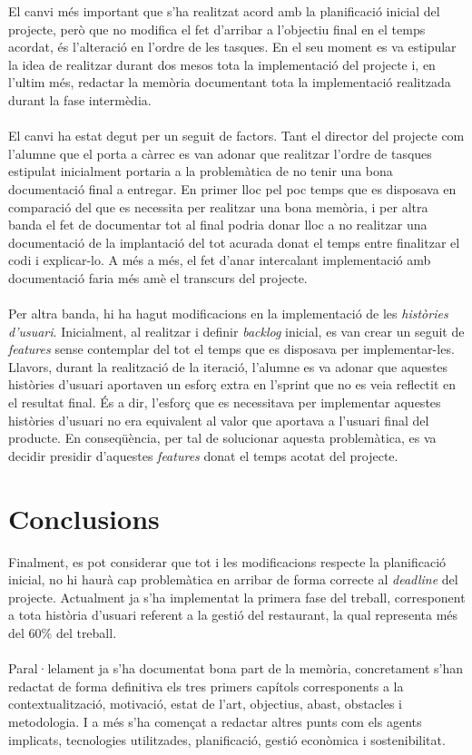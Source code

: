 El canvi més important que s'ha realitzat acord amb la planificació inicial del projecte, però que no modifica el fet d'arribar a l'objectiu final en el temps acordat, és l'alteració en l'ordre de les tasques. En el seu moment es va estipular la idea de realitzar durant dos mesos tota la implementació del projecte i, en l'ultim més, redactar la memòria documentant tota la implementació realitzada durant la fase intermèdia.
\\\\
El canvi ha estat degut per un seguit de factors. Tant el director del projecte com l'alumne que el porta a càrrec es van adonar que realitzar l'ordre de tasques estipulat inicialment portaria a la problemàtica de no tenir una bona documentació final a entregar. En primer lloc pel poc temps que es disposava en comparació del que es necessita per realitzar una bona memòria, i per altra banda el fet de documentar tot al final podria donar lloc a no realitzar una documentació de la implantació del tot acurada donat el temps entre finalitzar el codi i explicar-lo. A més a més, el fet d'anar intercalant implementació amb documentació faria més amè el transcurs del projecte.
\\\\
Per altra banda, hi ha hagut modificacions en la implementació de les \textit{històries d'usuari}. Inicialment, al realitzar i definir \textit{backlog} inicial, es van crear un seguit de \textit{features} sense contemplar del tot el temps que es disposava per implementar-les. Llavors, durant la realització de la iteració, l'alumne es va adonar que aquestes històries d'usuari aportaven un esforç extra en l'sprint que no es veia reflectit en el resultat final. És a dir, l'esforç que es necessitava per implementar aquestes històries d'usuari no era equivalent al valor que aportava a l'usuari final del producte. En conseqüència, per tal de solucionar aquesta problemàtica, es va decidir presidir d'aquestes \textit{features} donat el temps acotat del projecte.


\section{Conclusions}

Finalment, es pot considerar que tot i les modificacions respecte la planificació inicial, no hi haurà cap problemàtica en arribar de forma correcte al \textit{deadline} del projecte. Actualment ja s'ha implementat la primera fase del treball, corresponent a tota història d'usuari referent a la gestió del restaurant, la qual representa més del 60\% del treball.
\\\\
Paral·lelament ja s'ha documentat bona part de la memòria, concretament s'han redactat de forma definitiva els tres primers capítols corresponents a la contextualització, motivació, estat de l'art, objectius, abast, obstacles i metodologia. I a més s'ha començat a redactar altres punts com els agents implicats, tecnologies utilitzades, planificació, gestió econòmica i sostenibilitat.